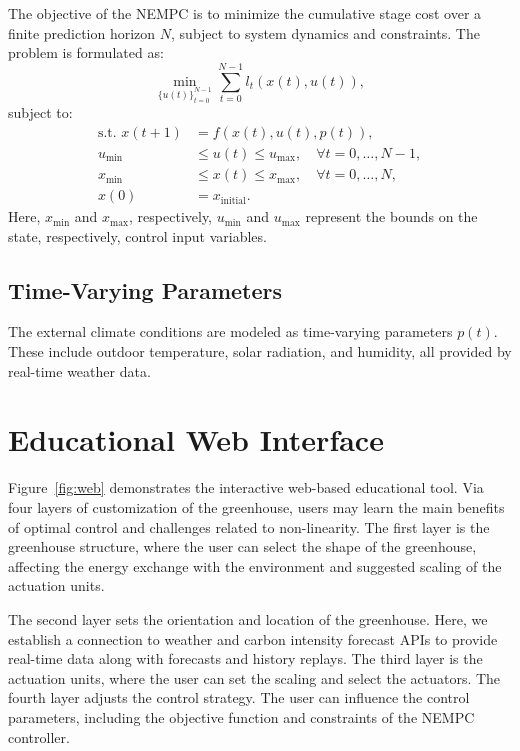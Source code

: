 \documentclass[conference]{IEEEtran}
\begin{document}
The objective of the NEMPC is to minimize the cumulative stage cost over a finite prediction horizon \(N\), subject to system dynamics and constraints. The problem is formulated as:
\begin{equation}
    \min_{{\{u(t)\}}_{t=0}^{N-1}} \sum_{t=0}^{N-1} l_t(x(t), u(t)),
\end{equation}
subject to:
\begin{align}
    \text{s.t. } x(t+1) & = f(x(t), u(t), p(t)),                                    \\
    u_{\min}            & \leq u(t) \leq u_{\max}, \quad \forall t = 0, \dots, N-1, \\
    x_{\min}            & \leq x(t) \leq x_{\max}, \quad \forall t = 0, \dots, N,   \\
    x(0)                & = x_{\text{initial}}.
\end{align}
Here, \(x_{\min}\) and \(x_{\max}\), respectively, \(u_{\min}\) and \(u_{\max}\) represent the bounds on the state, respectively, control input variables.

\subsection{Time-Varying Parameters}

The external climate conditions are modeled as time-varying parameters \( p(t) \). These include outdoor temperature, solar radiation, and humidity, all provided by real-time weather data.

\section{Educational Web Interface}
Figure~\ref{fig:web} demonstrates the interactive web-based educational tool. Via four layers of customization of the greenhouse, users may learn the main benefits of optimal control and challenges related to non-linearity. The first layer is the greenhouse structure, where the user can select the shape of the greenhouse, affecting the energy exchange with the environment and suggested scaling of the actuation units.

The second layer sets the orientation and location of the greenhouse. Here, we establish a connection to weather and carbon intensity forecast APIs to provide real-time data along with forecasts and history replays.
The third layer is the actuation units, where the user can set the scaling and select the actuators. The fourth layer adjusts the control strategy. The user can influence the control parameters, including the objective function and constraints of the NEMPC controller.
\end{document}
